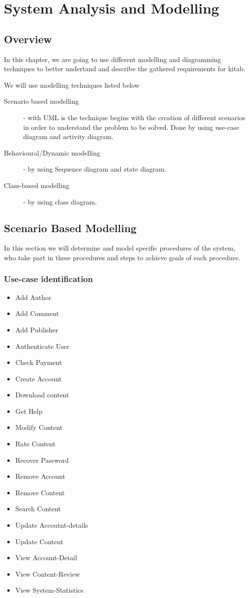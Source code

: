 \chapter{System Analysis and Modelling}
\section{Overview}

In this chapter, we are going to use different modelling and diagramming techniques to better undertand and describe the gathered requirements for kitab.

We will use modelling techniques listed below

	\begin{description}
		\item[Scenario based modelling] - with UML is the technique begins with the creation of different scenarios in order to understand the problem to be solved. Done by using use-case diagram and activity diagram.
		\item[Behavioural/Dynamic modelling] - by using Sequence diagram and state diagram.
		\item[Class-based modelling] - by using class diagram.
	\end{description}

\section{Scenario Based Modelling}

In this section we will determine and model specific procedures of the system, who take part in these procedures and steps to achieve goals of each procedure.

	\subsection{Use-case identification}

	\begin{itemize}
		\item Add Author
		\item Add Comment
		\item Add Publisher
		\item Authenticate User
		\item Check Payment
		\item Create Account
		\item Download content
		\item Get Help
		\item Modify Content
		\item Rate Content
		\item Recover Password
		\item Remove Account
		\item Remove Content
		\item Search Content
		\item Update Accoutnt-details
		\item Update Content
		\item View Account-Detail
		\item View Content-Review
		\item View System-Statistics
	\end{itemize}


